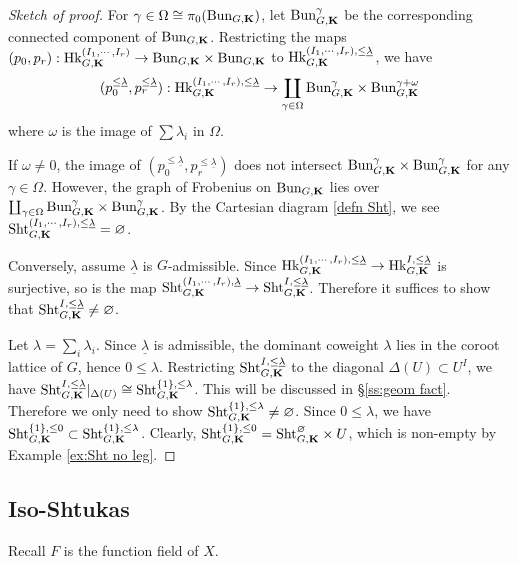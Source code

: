 \documentclass[11pt]{amsart}
\numberwithin{equation}{section}
\theoremstyle{plain}
\theoremstyle{definition}
\def\bK{\mathbf{K}}
\newcommand{\Bun}{\textup{Bun}}
\newcommand{\Hk}{\textup{Hk}}
\newcommand\Sht{\textup{Sht}}
\newcommand\un{\underline}
\newcommand{\vn}{\varnothing}
\newcommand\g\gamma
\newcommand\D\Delta
\renewcommand{\l}{\lambda}
\newcommand{\om}{\omega}
\newcommand{\Om}{\Omega}
\begin{document}
\begin{proof}[Sketch of proof]

For $\g\in \Om\cong \pi_{0}(\Bun_{G,\bK})$, let $\Bun_{G, \bK}^{\g}$ be the corresponding  connected component of $\Bun_{G,\bK}$. Restricting the maps $(p_{0},p_{r}): \Hk^{(I_{1},\cdots, I_{r})}_{G,\bK}\to \Bun_{G,\bK}\times\Bun_{G,\bK}$ to $\Hk^{(I_{1},\cdots, I_{r}), \le\un\l}_{G,\bK}$, we have
\begin{equation*}
(p^{\le\un\l}_{0},p^{\le\un\l}_{r}):  \Hk^{(I_{1},\cdots, I_{r}), \le\un\l}_{G,\bK}\to \coprod_{\g\in \Om} \Bun_{G,\bK}^{\g}\times \Bun^{\g+\om}_{G,\bK} 
\end{equation*}
where $\om$ is the image of $\sum\l_{i}$ in $\Om$. 

If $\om\ne0$, the image of $(p^{\le\un\l}_{0},p^{\le\un\l}_{r})$ does not intersect $\Bun_{G,\bK}^{\g}\times \Bun^{\g}_{G,\bK}$ for any $\g\in \Om$. However, the graph of Frobenius on $\Bun_{G,\bK}$ lies over  $\coprod_{\g\in \Om} \Bun_{G,\bK}^{\g}\times \Bun^{\g}_{G,\bK} 
$. By the Cartesian diagram \eqref{defn Sht}, we see $\Sht^{(I_{1},\cdots, I_{r}), \le\un\l}_{G,\bK}=\vn$.

Conversely, assume $\un\l$ is $G$-admissible. Since $\Hk^{(I_{1},\cdots, I_{r}),\le\un\l}_{G, \bK}\to \Hk^{I,\le\un\l}_{G,\bK}$ is surjective, so is the map $\Sht^{(I_{1},\cdots, I_{r}),\un\l}_{G, \bK}\to \Sht^{I,\le\un\l}_{G,\bK}$. Therefore it suffices to show that $\Sht^{I,\le\un\l}_{G,\bK}\ne\vn$. 

Let $\l=\sum_{i}\l_{i}$. Since $\un\l$ is admissible, the dominant coweight $\l$ lies in the coroot lattice of $G$, hence $0\le \l$. Restricting $\Sht^{I,\le\un\l}_{G,\bK}$ to the diagonal $\D(U)\subset U^{I}$, we have $\Sht^{I,\le\un\l}_{G,\bK}|_{\D(U)}\cong \Sht^{\{1\},\le\l}_{G,\bK}$. This will be discussed in \S\ref{ss:geom fact}. Therefore we only need to show $\Sht^{\{1\},\le\l}_{G,\bK}\ne\vn$. Since $0\le \l$, we have $\Sht^{\{1\},\le0}_{G,\bK}\subset \Sht^{\{1\},\le\l}_{G,\bK}$. Clearly, $\Sht^{\{1\},\le0}_{G,\bK}=\Sht^{\vn}_{G,\bK}\times U$, which is non-empty by Example \ref{ex:Sht no leg}.
\end{proof} 


\subsection{Iso-Shtukas}

Recall $F$ is the function field of $X$.
\end{document}
